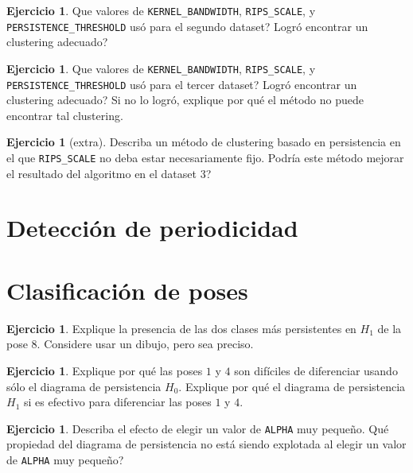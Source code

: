 \documentclass[12pt,reqno,oneside]{article}
\theoremstyle{definition}
\newtheorem{pregunta}[theorem]{Ejercicio}
\begin{document}
\begin{pregunta}
	Que valores de \texttt{KERNEL\_BANDWIDTH}, \texttt{RIPS\_SCALE}, y \texttt{PERSISTENCE\_THRESHOLD} us\'o para el segundo dataset?
	Logr\'o encontrar un clustering adecuado?
\end{pregunta}

\begin{pregunta}
	Que valores de \texttt{KERNEL\_BANDWIDTH}, \texttt{RIPS\_SCALE}, y \texttt{PERSISTENCE\_THRESHOLD} us\'o para el tercer dataset?
	Logr\'o encontrar un clustering adecuado?
	Si no lo logr\'o, explique por qu\'e el m\'etodo no puede encontrar tal clustering.
\end{pregunta}

\begin{pregunta}[extra]
	Describa un m\'etodo de clustering basado en persistencia en el que \texttt{RIPS\_SCALE} no deba estar necesariamente fijo.
	Podr\'ia este m\'etodo mejorar el resultado del algoritmo en el dataset 3?
\end{pregunta}

\section{Detecci\'on de periodicidad}


\section{Clasificaci\'on de poses}

\begin{pregunta}
	Explique la presencia de las dos clases m\'as persistentes en $H_1$ de la pose $8$.
	Considere usar un dibujo, pero sea preciso.
\end{pregunta}

\begin{pregunta}
	Explique por qu\'e las poses $1$ y $4$ son dif\'iciles de diferenciar usando s\'olo el diagrama de persistencia $H_0$.
	Explique por qu\'e el diagrama de persistencia $H_1$ si es efectivo para diferenciar las poses $1$ y $4$.
\end{pregunta}

\begin{pregunta}
	Describa el efecto de elegir un valor de \texttt{ALPHA} muy peque\~no.
	Qu\'e propiedad del diagrama de persistencia no est\'a siendo explotada al elegir un valor de \texttt{ALPHA} muy peque\~no?
\end{pregunta}
\end{document}
